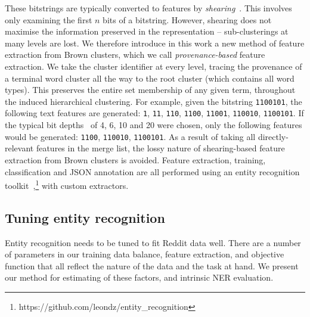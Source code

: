 \documentclass[10pt,journal,compsoc]{IEEEtran}
\begin{document}
These bitstrings are typically converted to features by \emph{shearing}~\cite{derczynski2016generalised}.
This involves only examining the first $n$ bits of a bitstring.
However, shearing does not maximise the information preserved in the representation -- sub-clusterings at many levels are lost.
We therefore introduce in this work a new method of feature extraction from Brown clusters, which we call {\em provenance-based} feature extraction.
We take the cluster identifier at every level, tracing the provenance of a terminal word cluster all the way to the root cluster (which contains all word types).
This preserves the entire set membership of any given term, throughout the induced hierarchical clustering.
For example, given the bitstring {\tt 1100101}, the following text features are generated: {\tt 1}, {\tt 11}, {\tt 110}, {\tt 1100}, {\tt 11001}, {\tt 110010}, {\tt 1100101}.
If the typical bit depths~\cite{ratinov2009design} of 4, 6, 10 and 20 were chosen, only the following features would be generated: {\tt 1100}, {\tt 110010}, {\tt 1100101}.
As a result of taking all directly-relevant features in the merge list, the lossy nature of shearing-based feature extraction from Brown clusters is avoided.
Feature extraction, training, classification and JSON annotation are all performed using an entity recognition toolkit~\cite{derczynski2015usfd},\footnote{https://github.com/leondz/entity\_recognition} with custom extractors.


\subsection{Tuning entity recognition}

Entity recognition needs to be tuned to fit Reddit data well.
There are a number of parameters in our training data balance, feature extraction, and objective function that all reflect the nature of the data and the task at hand.
We present our method for estimating of these factors, and intrinsic NER evaluation.
\end{document}
